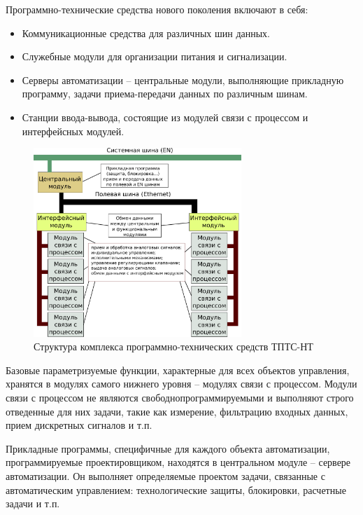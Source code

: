 \documentclass[a4paper,14pt,bachelor]{disser}
\begin{document}
Программно-технические средства нового поколения включают в себя:
\begin{itemize}
 \item Коммуникационные средства для различных шин данных.
 \item Служебные модули для организации питания и сигнализации.
 \item Серверы автоматизации -- центральные модули, выполняющие прикладную программу, задачи приема-передачи данных по различным шинам.
 \item Станции ввода-вывода, состоящие из модулей связи с процессом и интерфейсных модулей.
\end{itemize}

\begin{figure}[h!] %
\addtocounter{myfigs}{1}
 \begin{center}
 \includegraphics[width=0.7\textwidth]{tpts-nt}
 \caption{\label{tpts-main} Структура комплекса программно-технических средств ТПТС-НТ}
 \end{center}
\end{figure}

Базовые параметризуемые функции, характерные для всех объектов управления, хранятся в модулях самого нижнего уровня -- модулях связи с процессом. Модули связи с процессом не являются свободнопрограммируемыми и выполняют строго отведенные для них задачи, такие как измерение, фильтрацию входных данных, прием дискретных сигналов и т.п.

Прикладные программы, специфичные для каждого объекта автоматизации, программируемые проектировщиком, находятся в центральном модуле -- сервере автоматизации. Он выполняет определяемые проектом задачи, связанные с автоматическим управлением: технологические защиты, блокировки, расчетные задачи и т.п.
\end{document}
